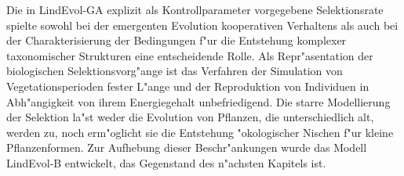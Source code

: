 Die in LindEvol-GA explizit als Kontrollparameter vorgegebene Selektionsrate spielte sowohl bei der emergenten
Evolution kooperativen Verhaltens als auch bei der Charakterisierung der Bedingungen f"ur die Entstehung komplexer
taxonomischer Strukturen eine entscheidende Rolle. Als Repr"asentation der biologischen Selektionsvorg"ange ist
das Verfahren der Simulation von Vegetationsperioden fester L"ange und der Reproduktion von Individuen in Abh"angigkeit
von ihrem Energiegehalt unbefriedigend. Die starre Modellierung der Selektion la"st weder die Evolution von Pflanzen,
die unterschiedlich alt, werden zu, noch erm"oglicht sie die Entstehung "okologischer Nischen f"ur kleine Pflanzenformen.
Zur Aufhebung dieser Beschr"ankungen wurde das Modell LindEvol-B entwickelt, das Gegenstand des n"achsten Kapitels ist.

